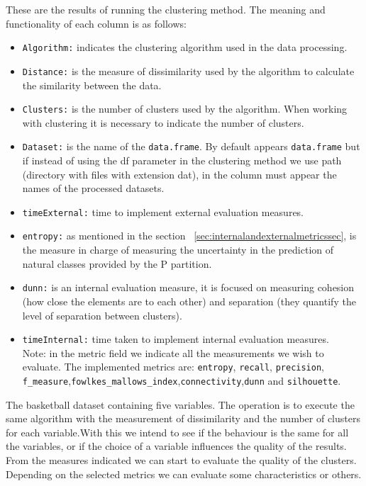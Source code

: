 These are the results of running the clustering method. The meaning and functionality of each column is as follows:
\begin{itemize}
  \item \texttt{Algorithm:} indicates the clustering algorithm used in the data processing.
  \item \texttt{Distance:} is the measure of dissimilarity used by the algorithm to calculate the similarity between the data.
  \item \texttt{Clusters:} is the number of clusters used by the algorithm. When working with clustering it is necessary to indicate the number of clusters.
  \item \texttt{Dataset:} is the name of the \texttt{data.frame}. By default appears \texttt{data.frame} but if instead of using the df parameter in the clustering method we use path (directory with files with extension dat), in the column must appear the names of the processed datasets.
  \item \texttt{timeExternal:} time to implement external evaluation measures.
  \item \texttt{entropy:} as mentioned in the section ~\ref{sec:internalandexternalmetricssec}, is the measure in charge of measuring the uncertainty in the prediction of natural classes provided by the P partition.
  \item \texttt{dunn:} is an internal evaluation measure, it is focused on measuring cohesion (how close the elements are to each other) and separation (they quantify the level of separation between clusters).
  \item \texttt{timeInternal:} time taken to implement internal evaluation measures.\\
Note: in the metric field we indicate all the measurements we wish to evaluate. The implemented metrics are: \texttt{entropy}, \texttt{recall}, \texttt{precision}, \texttt{f\_measure},\texttt{fowlkes\_mallows\_index},\texttt{connectivity},\texttt{dunn} and \texttt{silhouette}.
\end{itemize}

The basketball dataset containing five variables. The operation is to execute the same algorithm with the measurement of dissimilarity and the number of clusters for each variable.With this we intend to see if the behaviour is the same for all the variables, or if the choice of a variable influences the quality of the results. From the measures indicated we can start to evaluate the quality of the clusters. Depending on the selected metrics we can evaluate some characteristics or others.

